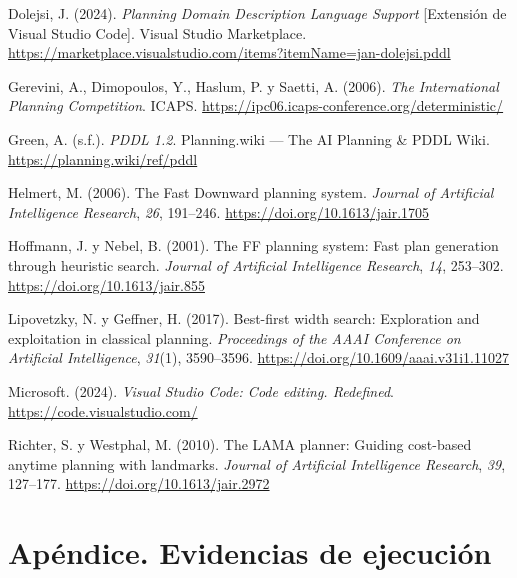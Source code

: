 \documentclass[12pt,a4paper]{article}
\newenvironment{referencias}
  {\begin{list}{}{%
      \setlength{\leftmargin}{1.25cm}%
      \setlength{\itemindent}{-1.25cm}%
      \setlength{\itemsep}{0.6em}%
      \setlength{\parsep}{0pt}}}
  {\end{list}}
\begin{document}
\begin{referencias}
\item Dolejsi, J. (2024). \emph{Planning Domain Description Language
Support} [Extensi\'on de Visual Studio Code]. Visual Studio Marketplace.
\url{https://marketplace.visualstudio.com/items?itemName=jan-dolejsi.pddl}

\item Gerevini, A., Dimopoulos, Y., Haslum, P. y Saetti, A. (2006).
\emph{The International Planning Competition}. ICAPS.
\url{https://ipc06.icaps-conference.org/deterministic/}

\item Green, A. (s.f.). \emph{PDDL 1.2}. Planning.wiki --- The AI Planning
\& PDDL Wiki. \url{https://planning.wiki/ref/pddl}

\item Helmert, M. (2006). The Fast Downward planning system.
\emph{Journal of Artificial Intelligence Research}, \emph{26}, 191--246.
\url{https://doi.org/10.1613/jair.1705}

\item Hoffmann, J. y Nebel, B. (2001). The FF planning system: Fast plan
generation through heuristic search. \emph{Journal of Artificial
Intelligence Research}, \emph{14}, 253--302.
\url{https://doi.org/10.1613/jair.855}

\item Lipovetzky, N. y Geffner, H. (2017). Best-first width search:
Exploration and exploitation in classical planning. \emph{Proceedings of the
AAAI Conference on Artificial Intelligence}, \emph{31}(1), 3590--3596.
\url{https://doi.org/10.1609/aaai.v31i1.11027}

\item Microsoft. (2024). \emph{Visual Studio Code: Code editing.
Redefined}. \url{https://code.visualstudio.com/}

\item Richter, S. y Westphal, M. (2010). The LAMA planner: Guiding
cost-based anytime planning with landmarks. \emph{Journal of Artificial
Intelligence Research}, \emph{39}, 127--177.
\url{https://doi.org/10.1613/jair.2972}
\end{referencias}

\newpage
\appendix
\section{Ap\'endice. Evidencias de ejecuci\'on}
\end{document}
